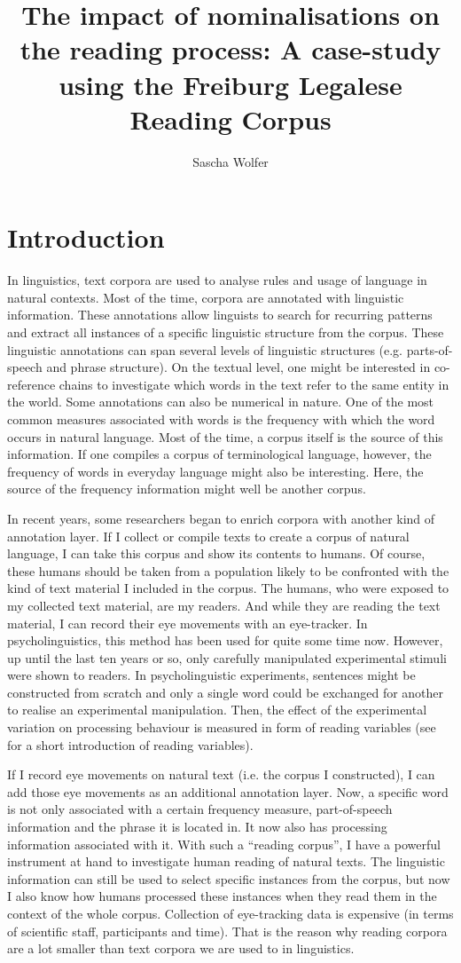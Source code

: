 \documentclass[output=paper]{langsci/langscibook}
\author{%
Sascha Wolfer\affiliation{Institute for the German Language, Mannheim}
}
\title{The impact of nominalisations on the reading process: {A} case-study using the {Freiburg Legalese Reading Corpus}}
\begin{document}
\section{Introduction}

In linguistics, text corpora are used to analyse rules and usage of language in natural contexts. Most of the time, corpora are annotated with linguistic information. These annotations allow linguists to search for recurring patterns and extract all instances of a specific linguistic structure from the corpus. These linguistic annotations can span several levels of linguistic structures (e.g. parts-of-speech and phrase structure). On the textual level, one might be interested in co-reference chains to investigate which words in the text refer to the same entity in the world. Some annotations can also be numerical in nature. One of the most common measures associated with words is the frequency with which the word occurs in natural language. Most of the time, a corpus itself is the source of this information. If one compiles a corpus of terminological language, however, the frequency of words in everyday language might also be interesting. Here, the source of the frequency information might well be another corpus.

In recent years, some researchers began to enrich corpora with another kind of annotation layer. If I collect or compile texts to create a corpus of natural language, I can take this corpus and show its contents to humans. Of course, these humans should be taken from a population likely to be confronted with the kind of text material I included in the corpus. The humans, who were exposed to my collected text material, are my readers. And while they are reading the text material, I can record their eye movements with an eye-tracker. In psycholinguistics, this method has been used for quite some time now. However, up until the last ten years or so, only carefully manipulated experimental stimuli were shown to readers. In psycholinguistic experiments, sentences might be constructed from scratch and only a single word could be exchanged for another to realise an experimental manipulation. Then, the effect of the experimental variation on processing behaviour is measured in form of reading variables (see  for a short introduction of reading variables). 

If I record eye movements on natural text (i.e. the corpus I constructed), I can add those eye movements as an additional annotation layer. Now, a specific word is not only associated with a certain frequency measure, part-of-speech information and the phrase it is located in. It now also has processing information associated with it. With such a ``reading corpus'', I have a powerful instrument at hand to investigate human reading of natural texts. The linguistic information can still be used to select specific instances from the corpus, but now I also know how humans processed these instances when they read them in the context of the whole corpus. Collection of eye-tracking data is expensive (in terms of scientific staff, participants and time). That is the reason why reading corpora are a lot smaller than text corpora we are used to in linguistics.
\end{document}
